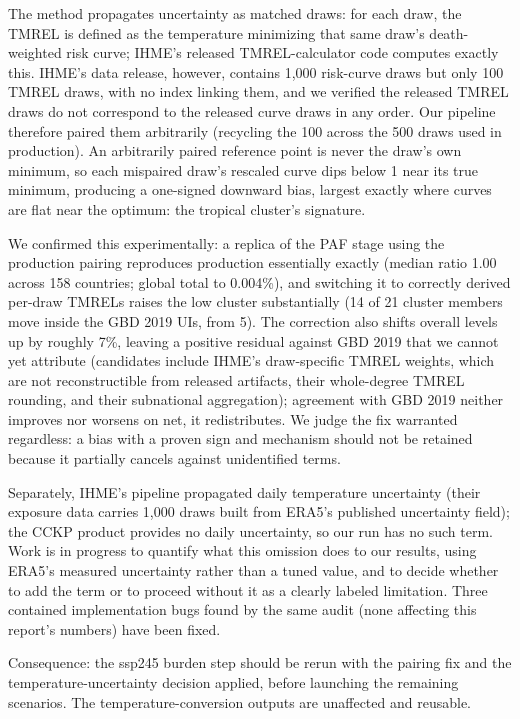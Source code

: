 \documentclass[11pt]{ozreport}
\begin{document}
The method propagates uncertainty as matched draws: for each draw, the
TMREL is defined as the temperature minimizing that same draw's
death-weighted risk curve; IHME's released TMREL-calculator code computes
exactly this. IHME's data release, however, contains 1{,}000
risk-curve draws but only 100 TMREL draws, with no index linking them, and
we verified the released TMREL draws do not correspond to the released
curve draws in any order. Our pipeline therefore paired them arbitrarily
(recycling the 100 across the 500 draws used in production). An
arbitrarily paired reference point is never the draw's own minimum, so
each mispaired draw's rescaled curve dips below 1 near its true minimum,
producing a one-signed downward bias, largest exactly where curves are
flat near the optimum: the tropical cluster's signature.

We confirmed this experimentally: a replica of the PAF stage using the
production pairing reproduces production essentially exactly (median ratio
1.00 across 158 countries; global total to 0.004\%), and switching it to
correctly derived per-draw TMRELs raises the low cluster substantially
(14 of 21 cluster members move inside the GBD 2019 UIs, from 5). The
correction also shifts overall levels up by roughly 7\%, leaving a
positive residual against GBD 2019 that we cannot yet attribute
(candidates include IHME's draw-specific TMREL weights, which are not
reconstructible from released artifacts, their whole-degree TMREL
rounding, and their subnational aggregation); agreement with GBD 2019
neither improves nor worsens on net, it redistributes. We judge the fix
warranted regardless: a bias with a proven sign and mechanism should not
be retained because it partially cancels against unidentified terms.

Separately, IHME's pipeline propagated daily temperature uncertainty
(their exposure data carries 1{,}000 draws built from ERA5's published
uncertainty field); the CCKP product provides no daily uncertainty, so our
run has no such term. Work is in progress to quantify what this omission
does to our results, using ERA5's measured uncertainty rather than a tuned
value, and to decide whether to add the term or to proceed without it as a
clearly labeled limitation. Three contained implementation bugs found by
the same audit (none affecting this report's numbers) have been fixed.

Consequence: the ssp245 burden step should be rerun with the pairing fix
and the temperature-uncertainty decision applied, before launching the
remaining scenarios. The temperature-conversion outputs are unaffected
and reusable.
\end{document}
